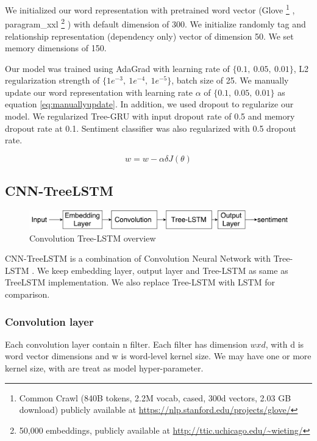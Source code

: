 We initialized our word representation with pretrained word vector (Glove \footnote{Common Crawl (840B tokens, 2.2M vocab, cased, 300d vectors, 2.03 GB download) publicly available at \url{https://nlp.stanford.edu/projects/glove/}} \cite{glove}, paragram\_xxl \footnote{50,000 embeddings, publicly available at \url{http://ttic.uchicago.edu/~wieting/}} \cite{wieting2015towards}) with default dimension of 300.  We initialize randomly tag and relationship representation (dependency only) vector of dimension 50. We set memory dimensions of 150. 

Our model was trained using AdaGrad \cite{duchi2011adaptive} with learning rate of $\{0.1,~ 0.05,~ 0.01\}$, L2 regularization strength of $\{1e^{-3},~ 1e^{-4}, ~ 1e^{-5} \}$, batch size of 25. We manually update our word representation with learning rate $\alpha$ of $\{0.1,~0.05, ~0.01\}$ as equation \ref{eq:manuallyupdate}. In addition, we used dropout \cite{krizhevsky2012imagenet} to regularize our model. We regularized Tree-GRU with input dropout rate of 0.5 and memory dropout rate at 0.1. Sentiment classifier was also regularized with 0.5 dropout rate. 


\begin{equation}
\label{eq:manuallyupdate}
w = w - \alpha\delta J(\theta)
\end{equation}


\subsection{CNN-TreeLSTM}\label{sec:CNNtree}

\begin{figure}[H]
	\centering
	\includegraphics[width=0.8\linewidth]{figure/convtreelstmsummary}
	\caption[Convolution Tree-LSTM overview]{Convolution Tree-LSTM overview}
	\label{fig:convtreelstmsummary}
\end{figure}

CNN-TreeLSTM is a combination of Convolution Neural Network with Tree-LSTM \cite{treeLSTM}. We keep embedding layer, output layer and Tree-LSTM as same as TreeLSTM implementation. We also replace Tree-LSTM with LSTM for comparison.

\subsubsection{Convolution layer}
Each convolution layer contain n filter. Each filter has dimension $w x d$, with d is word vector dimensions and w is word-level kernel size. We may have one or more kernel size, with are treat as model hyper-parameter. 

